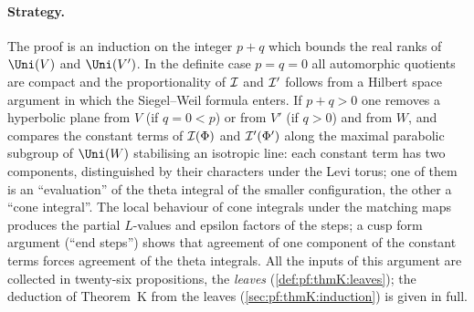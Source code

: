 \paragraph{Strategy.}
The proof is an induction on the integer $p+q$ which bounds the real ranks of $\Uni(V)$ and $\Uni(V')$. In the definite
case $p=q=0$ all automorphic quotients are compact and the proportionality of $\mathcal{I}$ and $\mathcal{I}'$ follows from a
Hilbert space argument in which the Siegel--Weil formula enters. If $p+q>0$ one removes a hyperbolic plane from $V$
(if $q=0<p$) or from $V'$ (if $q>0$) and from $W$, and compares the constant terms of $\mathcal{I}(\Phi)$ and
$\mathcal{I}'(\Phi')$ along the maximal parabolic subgroup of $\Uni(W)$ stabilising an isotropic line: each constant term has
two components, distinguished by their characters under the Levi torus; one of them is an ``evaluation'' of the theta
integral of the smaller configuration, the other a ``cone integral''. The local behaviour of cone integrals under the
matching maps produces the partial $L$-values and epsilon factors of the steps; a cusp form argument (``end steps'')
shows that agreement of one component of the constant terms forces agreement of the theta integrals. All the inputs of
this argument are collected in twenty-six propositions, the \emph{leaves} (\cref{def:pf:thmK:leaves}); the deduction of
Theorem~K from the leaves (\cref{sec:pf:thmK:induction}) is given in full.

